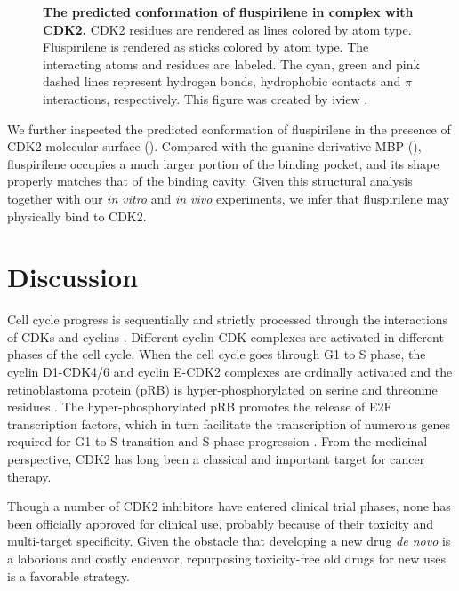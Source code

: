 \documentclass[10pt,letterpaper]{article}
\begin{document}
\begin{figure}%
\caption{{\bf The predicted conformation of fluspirilene in complex with CDK2.} CDK2 residues are rendered as lines colored by atom type. Fluspirilene is rendered as sticks colored by atom type. The interacting atoms and residues are labeled. The cyan, green and pink dashed lines represent hydrogen bonds, hydrophobic contacts and $\pi$ interactions, respectively. This figure was created by iview \cite{1366}.}
\label{1GZ8-ZINC00537755-iv}
\end{figure}

We further inspected the predicted conformation of fluspirilene in the presence of CDK2 molecular surface (). Compared with the guanine derivative MBP (), fluspirilene occupies a much larger portion of the binding pocket, and its shape properly matches that of the binding cavity. Given this structural analysis together with our \textit{in vitro} and \textit{in vivo} experiments, we infer that fluspirilene may physically bind to CDK2.

\section*{Discussion}

Cell cycle progress is sequentially and strictly processed through the interactions of CDKs and cyclins \cite{1612}. Different cyclin-CDK complexes are activated in different phases of the cell cycle. When the cell cycle goes through G1 to S phase, the cyclin D1-CDK4/6 and cyclin E-CDK2 complexes are ordinally activated and the retinoblastoma protein (pRB) is hyper-phosphorylated on serine and threonine residues \cite{1613}. The hyper-phosphorylated pRB promotes the release of E2F transcription factors, which in turn facilitate the transcription of numerous genes required for G1 to S transition and S phase progression \cite{1614}. From the medicinal perspective, CDK2 has long been a classical and important target for cancer therapy.

Though a number of CDK2 inhibitors have entered clinical trial phases, none has been officially approved for clinical use, probably because of their toxicity and multi-target specificity. Given the obstacle that developing a new drug \textit{de novo} is a laborious and costly endeavor, repurposing toxicity-free old drugs for new uses is a favorable strategy.
\end{document}
